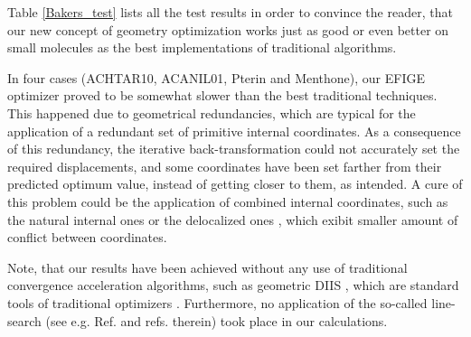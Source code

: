 \documentclass[prl,aps,twocolumn,showpacs,twocolumngrid,superbib]{revtex4}
\begin{document}
Table \ref{Bakers_test} lists all the test results
in order to convince
the reader, that our new concept of geometry optimization
works just as good or even better on small molecules 
as the best implementations
of traditional algorithms.

In four cases (ACHTAR10, ACANIL01, Pterin and Menthone), our 
EFIGE optimizer proved to be somewhat slower than the best traditional
techniques. This happened due to geometrical redundancies, which are
typical for the application of a redundant set of primitive internal
coordinates. As a consequence of this redundancy, the iterative
back-transformation could not accurately set the required displacements,
and some coordinates have been set farther from their predicted optimum 
value, instead of getting closer to them, as intended.
A cure of this problem could be the application of 
combined internal coordinates, such as the natural internal ones 
\cite{Pulay_natural_internals} or the 
delocalized ones \cite{Baker_deloc_1}, which exibit
smaller amount of conflict between coordinates. 

Note, that our results have been achieved without any use
of traditional convergence acceleration algorithms, such as 
geometric DIIS \cite{Pulay_GDIIS}, which are standard tools of
traditional optimizers \cite{Farkas_GDIIS}. Furthermore, 
no application of the so-called line-search (see e.g. Ref. \cite{bakken}
and refs. therein) took place in our calculations.
\end{document}
